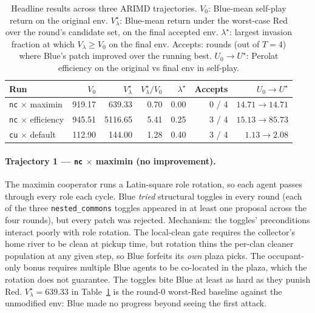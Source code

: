 \documentclass[11pt]{article}
\begin{document}
\begin{table}[t]
\centering
\small
\caption{Headline results across three ARIMD trajectories.
$V_0$: Blue-mean self-play return on the original env.
$V_\lambda^\star$: Blue-mean return under the worst-case Red over
the round's candidate set, on the final accepted env.
$\lambda^\star$: largest invasion fraction at which $V_\lambda
\geq V_0$ on the final env.  Accepts: rounds (out of $T=4$)
where Blue's patch improved over the running best.  $U_0 \to
U^\star$: Perolat efficiency on the original vs final env in
self-play.}
\label{tab:headline}
\begin{tabular}{lrrrrrr}
\toprule
Run & $V_0$ & $V_\lambda^\star$ & $V_\lambda^\star / V_0$ & $\lambda^\star$ & Accepts & $U_0 \to U^\star$ \\
\midrule
\texttt{nc} $\times$ maximin    & 919.17  & 639.33  & 0.70 & 0.00 & 0 / 4 & $14.71 \to 14.71$ \\
\texttt{nc} $\times$ efficiency & 945.51  & 5116.65 & 5.41 & 0.25 & 3 / 4 & $15.13 \to 85.73$ \\
\texttt{cu} $\times$ default    & 112.90  & 144.00  & 1.28 & 0.40 & 3 / 4 & $1.13  \to 2.08$ \\
\bottomrule
\end{tabular}
\end{table}

\paragraph{Trajectory 1 — \texttt{nc} $\times$ maximin (no improvement).}
The maximin cooperator runs a Latin-square role rotation, so each
agent passes through every role each cycle.  Blue \emph{tried}
structural toggles in every round (each of the three
\texttt{nested\_commons} toggles appeared in at least one proposal
across the four rounds), but every patch was rejected.
Mechanism: the toggles' preconditions interact poorly with role
rotation.  The local-clean gate requires the collector's home
river to be clean at pickup time, but rotation thins the per-clan
cleaner population at any given step, so Blue forfeits its
\emph{own} plaza picks.  The occupant-only bonus requires
multiple Blue agents to be co-located in the plaza, which the
rotation does not guarantee.  The toggles bite Blue at least as
hard as they punish Red.  $V_\lambda^\star = 639.33$ in
Table~\ref{tab:headline} is the round-0 worst-Red baseline against
the unmodified env: Blue made no progress beyond seeing the first
attack.
\end{document}
